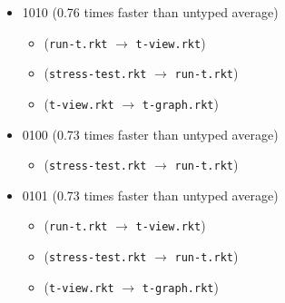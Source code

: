\documentclass{article}
\newcommand{\mono}[1]{\texttt{#1}}
\begin{document}
\begin{itemize}
\begin{itemize}
  \end{itemize}
\item 1010 (0.76 times faster than untyped average)
  \begin{itemize}
  \item (\mono{run-t.rkt} $\rightarrow$ \mono{t-view.rkt})
  \item (\mono{stress-test.rkt} $\rightarrow$ \mono{run-t.rkt})
  \item (\mono{t-view.rkt} $\rightarrow$ \mono{t-graph.rkt})
  \end{itemize}
\item 0100 (0.73 times faster than untyped average)
  \begin{itemize}
  \item (\mono{stress-test.rkt} $\rightarrow$ \mono{run-t.rkt})
  \end{itemize}
\item 0101 (0.73 times faster than untyped average)
  \begin{itemize}
  \item (\mono{run-t.rkt} $\rightarrow$ \mono{t-view.rkt})
  \item (\mono{stress-test.rkt} $\rightarrow$ \mono{run-t.rkt})
  \item (\mono{t-view.rkt} $\rightarrow$ \mono{t-graph.rkt})
  \end{itemize}


\end{itemize}
\end{document}
